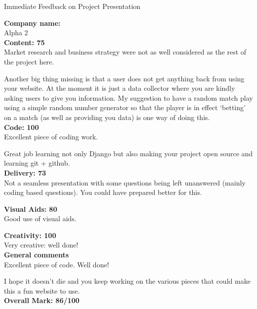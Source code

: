 \documentclass{article}
\begin{document}
\begin{center}
\Huge{Immediate Feedback on Project Presentation}\\
\end{center}


\normalsize
\textbf{Company name:}\\

Alpha 2 \\

\textbf{Content: 75}\\

Market research and business strategy were not as well considered as the rest of the project here.

Another big thing missing is that a user does not get anything back from using your website.
At the moment it is just a data collector where you are kindly asking users to give you information.
My suggestion to have a random match play using a simple random number generator so that the player is in effect `betting' on a match (as well as providing you data) is one way of doing this.\\

\textbf{Code: 100}\\

Excellent piece of coding work.

Great job learning not only Django but also making your project open source and learning git + github.\\

\textbf{Delivery: 73}\\

Not a seamless presentation with some questions being left unanswered (mainly coding based questions).
You could have prepared better for this.

\textbf{Visual Aids: 80}\\

Good use of visual aids.

\textbf{Creativity: 100}\\

Very creative: well done!\\


\textbf{General comments}\\

Excellent piece of code.
Well done!

I hope it doesn't die and you keep working on the various pieces that could make this a fun website to use.\\

\textbf{Overall Mark: 86/100}
\end{document}
